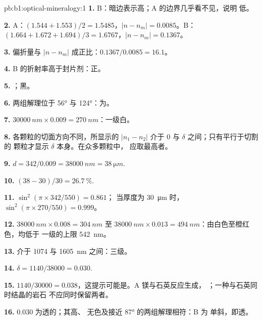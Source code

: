 \begin{solution}{pb:b1:optical-mineralogy:1}
\textbf{1.} B：暗边表示高；A 的边界几乎看不见，说明
低。

\textbf{2.} A：$(1.544 + 1.553)/2 = 1.5485$，$|n - n_m| = 0.0085$。B：
$(1.664 + 1.672 + 1.694)/3 = 1.6767$，$|n - n_m| = 0.1367$。

\textbf{3.} 偏折量与 $|n - n_m|$ 成正比：$0.1367/0.0085 =
16.1$。

\textbf{4.} B 的折射率高于封片剂：正。

\textbf{5.} ；黑。

\textbf{6.} 两组解理位于 \ang{56} 与 \ang{124}：为。

\textbf{7.} $\qty{30000}{nm}\times0.009 = \qty{270}{nm}$：一级白。

\textbf{8.} 各颗粒的切面方向不同，所显示的
$|n_1 - n_2|$ 介于 0 与 $\delta$ 之间；只有平行于切割的
颗粒才显示 $\delta$ 本身。在众多颗粒中，
应取最高者。

\textbf{9.} $d = 342/0.009 = \qty{38000}{nm} = \qty{38}{\micro m}$.

\textbf{10.} $(38 - 30)/30 = \qty{26.7}{\percent}$.

\textbf{11.} $\sin^2(\pi\times342/550) = 0.861$；
当厚度为 \qty{30}{\micro m} 时，$\sin^2(\pi\times270/550) = 0.999$。

\textbf{12.} $\qty{38000}{nm}\times0.008 = \qty{304}{nm}$ 至
$\qty{38000}{nm}\times0.013 = \qty{494}{nm}$：由白色至橙红色，均低于
一级的上限 \qty{542}{nm}。

\textbf{13.} 介于 1074 与 \qty{1605}{nm} 之间：三级。

\textbf{14.} $\delta = 1140/38000 = 0.030$.

\textbf{15.} $1140/30000 = 0.038$，这提示可能是。A
镁与石英反应生成，
；一种与石英同时结晶的岩石
不应同时保留两者。

\textbf{16.} $0.030$ 为透的；其高、
无色及接近 \ang{87} 的两组解理相符：B 为
单斜，即透。


\end{solution}
